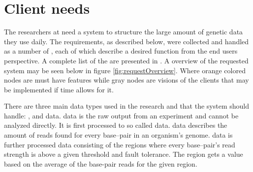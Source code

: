 \section{Client needs}
The researchers at  need a system to structure the large amount of genetic data they use daily. The requirements, as described below, were collected and handled as a number of , each of which describe a desired function from the end users perspective. A complete list of the  are presented in . %
A overview of the requested system may be seen below in figure \ref{fig:requestOverview}. Where orange colored nodes are must have features while gray nodes are visions of the clients that may be implemented if time allows for it.

There are three main data types used in the research and that the system should handle: ,  and  data.  data is the raw output from an experiment and cannot be analyzed directly. It is first processed to so called  data.  data describes the amount of reads found for every base--pair in an organism's genome.  data is further processed  data consisting of the regions where every base--pair's read strength is above a given threshold and fault tolerance. The region gets a value based on the average of the base-pair reads for the given region.

